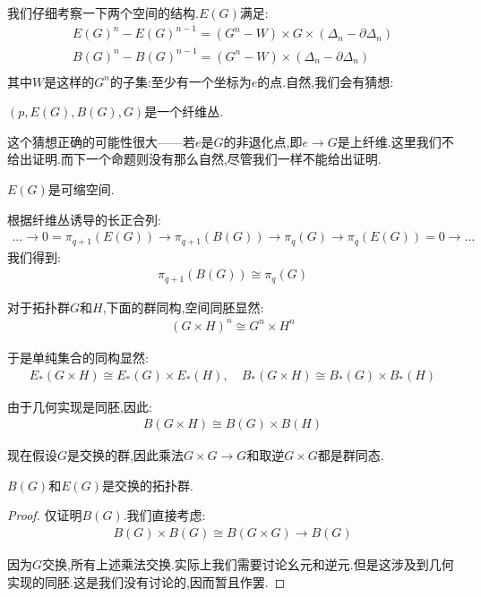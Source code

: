 我们仔细考察一下两个空间的结构.$E(G)$满足:
\begin{align*}
    E(G)^n -E(G)^{n-1}=(G^n-W)\times G \times (\Delta_n-\partial \Delta_n)\\
    B(G)^n -B(G)^{n-1}=(G^n-W)\times (\Delta_n-\partial \Delta_n)\\
\end{align*}
其中$W$是这样的$G^n$的子集:至少有一个坐标为$e$的点.自然,我们会有猜想:
\begin{proposition}
    $(p,E(G),B(G),G)$是一个纤维丛.
\end{proposition}
这个猜想正确的可能性很大——若$e$是$G$的非退化点,即$e \to G$是上纤维.这里我们不给出证明.而下一个命题则没有那么自然,尽管我们一样不能给出证明.
\begin{proposition}
    $E(G)$是可缩空间.
\end{proposition}

根据纤维丛诱导的长正合列:
\begin{align*}
    \dots \to 0=\pi_{q+1}(E(G)) \to \pi_{q+1}(B(G)) \to \pi_{q}(G) \to \pi_q(E(G))=0 \to \dots
\end{align*}
我们得到:
\begin{align*}
    \pi_{q+1}(B(G))\cong \pi_q(G)
\end{align*}

对于拓扑群$G$和$H$,下面的群同构,空间同胚显然:
\begin{align*}
    (G \times H)^n \cong G^n \times H^n
\end{align*}

于是单纯集合的同构显然:
\begin{align*}
    E_*(G \times H)\cong E_*(G) \times E_*(H),\quad B_*(G \times H)\cong B_*(G) \times B_*(H)
\end{align*}

由于几何实现是同胚,因此:
\begin{align*}
    B(G\times H)\cong B(G)\times B(H)
\end{align*}

现在假设$G$是交换的群,因此乘法$G \times G \to G$和取逆$G \times G$都是群同态.
\begin{proposition}
    $B(G)$和$E(G)$是交换的拓扑群.
\end{proposition}
\begin{proof}
    仅证明$B(G)$.我们直接考虑:
    \begin{align*}
        B(G)\times B(G) \cong B(G \times G) \to B(G)
    \end{align*}

    因为$G$交换,所有上述乘法交换.实际上我们需要讨论幺元和逆元.但是这涉及到几何实现的同胚.这是我们没有讨论的,因而暂且作罢.
\end{proof}

